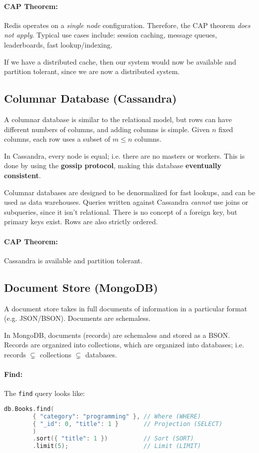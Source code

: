 \documentclass{report}
\newenvironment{example}{\begin{tcolorbox}[title={Example},colback=green!5!white,colframe=black!75!green]}{\end{tcolorbox}}
\renewcommand{\bf}[1]{\textbf{{#1}}}
\renewcommand{\tt}[1]{\texttt{{#1}}}
\renewcommand{\it}[1]{\textit{{#1}}}
\begin{document}
\paragraph{CAP Theorem:} Redis operates on a \it{single node} configuration.
Therefore, the CAP theorem \it{does not apply}. Typical use cases include:
session caching, message queues, leaderboards, fast lookup/indexing.
\begin{example}
    If we have a distributed cache, then our system would now be available and
    partition tolerant, since we are now a distributed system.
\end{example}

\subsection{Columnar Database (Cassandra)}
A columnar database is similar to the relational  model, but rows can have
different numbers of columns, and adding columns is simple. Given $n$ fixed
columns, each row uses a subset of $m \leq n$ columns.

In Cassandra, every node is equal; i.e. there are no masters or workers. This is
done by using the \bf{gossip protocol}, making this database
\bf{eventually consistent}.

Columnar databases are designed to be denormalized for fast lookups, and can be
used as data warehouses. Queries written against Cassandra \it{cannot} use joins
or subqueries, since it isn't relational. There is no concept of a foreign key,
but primary keys exist. Rows are also strictly ordered.

\paragraph{CAP Theorem:} Cassandra is available and partition tolerant.

\subsection{Document Store (MongoDB)}
A document store takes in full documents of information in a particular format
(e.g. JSON/BSON). Documents are schemaless.

In MongoDB, documents (records) are schemaless and stored as a BSON.
Records are organized into collections, which are organized into databases; i.e.
records $\subsetneq$ collections $\subsetneq$ databases.

\paragraph{Find:} The \tt{find} query looks like:
\begin{lstlisting}[language=C++, style=colorEX]
    db.Books.find(
        { "category": "programming" }, // Where (WHERE)
        { "_id": 0, "title": 1 }       // Projection (SELECT)
        )
        .sort({ "title": 1 })          // Sort (SORT)
        .limit(5);                     // Limit (LIMIT)
\end{lstlisting}
\end{document}
